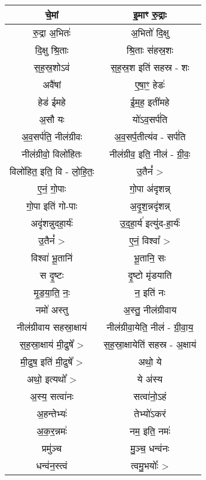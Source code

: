 {\begin{longtable}{|c|c|}
चे॒मां                      & इ॒माꣳ रु॒द्राः\\
\hline
रु॒द्रा अ॒भितः॑               & अ॒भितो॑ दि॒क्षु\\
\hline
दि॒क्षु श्रि॒ताः              & श्रि॒ताः स॑हस्र॒शः\\
\hline
स॒ह॒स्र॒शोऽव॑                 & स॒ह॒स्र॒श इति॑ सहस्र - शः\\
\hline
अवै॑षां                     & ए॒षा॒ꣳ॒ हेडः॑\\
\hline
हेड॑ ईमहे                   & ई॒म॒ह॒ इती॑महे\\
\hline
अ॒सौ यः                   & यो॑ऽव॒सर्प॑ति\\
\hline
अ॒व॒सर्प॑ति॒ नील॑ग्रीवः         & अ॒व॒सर्प॒तीत्य॑व - सर्प॑ति\\
\hline
नील॑ग्रीवो॒ विलो॑हितः        & नील॑ग्रीव॒ इति॒ नील॑ - ग्री॒वः॒\\
\hline
विलो॑हित॒ इति॒ वि - लो॒हि॒तः॒  & उ॒तैनं᳚ >\\
\hline
ए॒नं॒ गो॒पाः                 & गो॒पा अ॑दृशन्न्\\
\hline
गो॒पा इति॑ गो-पाः          & अ॒दृ॒श॒न्नदृ॑शन्न्\\
\hline
अदृ॑शन्नुदहा॒र्यः॑              & उ॒द॒हा॒र्य॑ इत्यु॑द-हा॒र्यः॑\\
\hline
उ॒तैनं᳚ >                    & ए॒नं॒ विश्वा᳚ >\\
\hline
विश्वा॑ भू॒तानि॑              & भू॒तानि॒ सः\\
\hline
स दृ॒ष्टः                   & दृ॒ष्टो मृ॑डयाति\\
\hline
मृ॒ड॒या॒ति॒ नः॒                & न॒ इति॑ नः\\
\hline
नमो॑ अस्तु                  & अ॒स्तु॒ नील॑ग्रीवाय\\
\hline
नील॑ग्रीवाय सहस्रा॒क्षाय॑      & नील॑ग्रीवा॒येति॒ नील॑ - ग्री॒वा॒य॒\\
\hline
स॒ह॒स्रा॒क्षाय॑ मी॒ढुषे᳚ >         & स॒ह॒स्रा॒क्षायेति॑ सहस्र - अ॒क्षाय॑\\
\hline
मी॒ढुष॒ इति॑ मी॒ढुषे᳚ >          & अथो॒ ये\\
\hline
अथो॒ इत्यथो᳚ >              & ये अ॑स्य\\
\hline
अ॒स्य॒ सत्वा॑नः               & सत्वा॑नो॒ऽहं\\
\hline
अ॒हन्तेभ्यः॑                  & तेभ्यो॑ऽकरं\\
\hline
अ॒क॒र॒न्नमः॑                  & नम॒ इति॒ नमः॑\\
\hline
प्रमु॑ञ्च                    & मु॒ञ्च॒ धन्व॑नः\\
\hline
धन्व॑न॒स्त्वं                  & त्वमु॒भयोः᳚ >\\

\end{longtable}}
